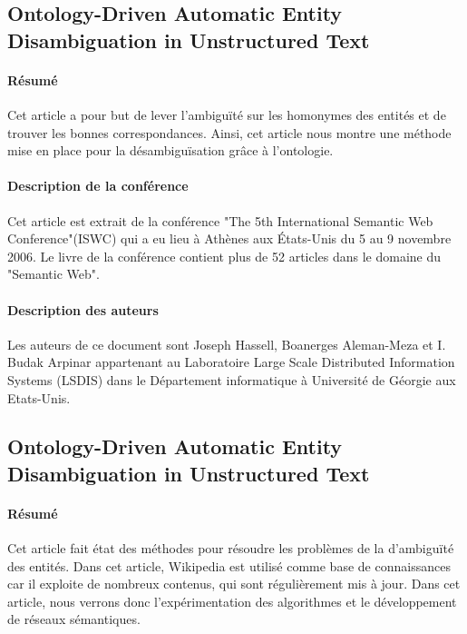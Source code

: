 \documentclass{article}
\begin{document}
\subsection{Ontology-Driven Automatic Entity Disambiguation in Unstructured Text\cite{article-6}}
\paragraph{Résumé}
Cet article a pour but de lever l'ambiguïté sur les homonymes des entités et de trouver les bonnes correspondances. Ainsi, cet article nous montre une méthode mise en place pour la désambiguïsation grâce à l'ontologie.

\paragraph{Description de la conférence}
Cet article est extrait de la conférence "The 5th International Semantic Web Conference"(ISWC) qui a eu lieu à Athènes aux États-Unis du 5 au 9 novembre 2006. Le livre de la conférence contient plus de 52 articles dans le domaine du "Semantic Web".

\paragraph{Description des auteurs}
Les auteurs de ce document sont Joseph Hassell, Boanerges Aleman-Meza et I. Budak Arpinar appartenant au Laboratoire Large Scale Distributed Information Systems (LSDIS) dans le Département informatique à Université de Géorgie aux Etats-Unis.

\subsection{Ontology-Driven Automatic Entity Disambiguation in Unstructured Text\cite{article-8}}
\paragraph{Résumé}
Cet article fait état des méthodes pour résoudre les problèmes de la d'ambiguïté des entités. Dans cet article, Wikipedia est utilisé comme base de connaissances car il exploite de nombreux contenus, qui sont régulièrement mis à jour. Dans cet article, nous verrons donc l'expérimentation des algorithmes et le développement de réseaux sémantiques.
\end{document}
